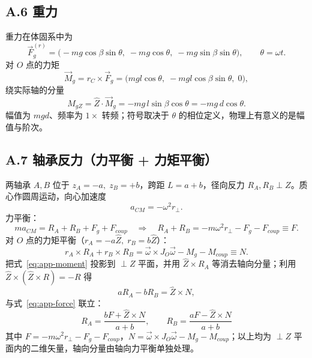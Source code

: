 \documentclass[11pt,a4paper]{article}
\theoremstyle{remark}\newtheorem{remark}{注}
\begin{document}
\subsection*{A.6 重力}

重力在体固系中为
\begin{equation}
\vec F_g^{(r)}=\bigl(-mg\cos\beta\sin\theta,\;-mg\cos\theta,\;-mg\sin\beta\sin\theta\bigr),
\qquad \theta=\omega t .
\end{equation}
对 $O$ 点的力矩
\begin{equation}
\vec M_g=r_C\times\vec F_g
=\bigl(mgl\cos\theta,\;-mgl\cos\beta\sin\theta,\;0\bigr),
\end{equation}
绕实际轴的分量
\begin{equation}
M_{gZ}=\hat Z\cdot\vec M_g=-mg\,l\sin\beta\cos\theta=-mg\,d\cos\theta .
\label{eq:app-MgZ}
\end{equation}
幅值为 $mgd$、频率为 $1\times$ 转频；符号取决于 $\theta$ 的相位定义，物理上有意义的是幅值与阶次。

\subsection*{A.7 轴承反力（力平衡 + 力矩平衡）}

两轴承 $A,B$ 位于 $z_A=-a,\;z_B=+b$，跨距 $L=a+b$，径向反力 $R_A,R_B\perp Z$。质心作圆周运动，向心加速度
\begin{equation}
a_{CM}=-\omega^2r_\perp .
\end{equation}
力平衡：
\begin{equation}
m a_{CM}=R_A+R_B+F_g+F_{coup}
\quad\Longrightarrow\quad
R_A+R_B=-m\omega^2r_\perp-F_g-F_{coup}\equiv F .
\label{eq:app-force}
\end{equation}
对 $O$ 点的力矩平衡（$r_A=-a\hat Z,\;r_B=b\hat Z$）：
\begin{equation}
r_A\times R_A+r_B\times R_B
=\vec\omega\times J_O\vec\omega-M_g-M_{coup}\equiv N .
\label{eq:app-moment}
\end{equation}
把式~\eqref{eq:app-moment} 投影到 $\perp Z$ 平面，并用 $\hat Z\times R_A$ 等消去轴向分量；利用 $\hat Z\times(\hat Z\times R)=-R$ 得
\begin{equation}
aR_A-bR_B=\hat Z\times N ,
\end{equation}
与式~\eqref{eq:app-force} 联立：
\begin{equation}
\boxed{\;R_A=\frac{bF+\hat Z\times N}{a+b},\qquad
R_B=\frac{aF-\hat Z\times N}{a+b}\;}
\label{eq:app-RA}
\end{equation}
其中 $F=-m\omega^2r_\perp-F_g-F_{coup}$，$N=\vec\omega\times J_O\vec\omega-M_g-M_{coup}$；以上均为 $\perp Z$ 平面内的二维矢量，轴向分量由轴向力平衡单独处理。
\end{document}

